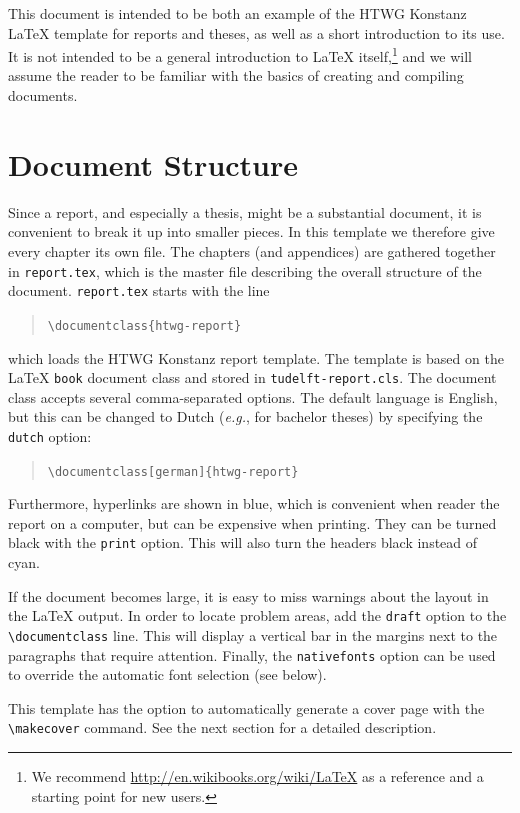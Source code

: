 This document is intended to be both an example of the HTWG Konstanz \LaTeX{} template for reports and theses, as well as a short introduction to its use. It is not intended to be a general introduction to \LaTeX{} itself,\footnote{We recommend \url{http://en.wikibooks.org/wiki/LaTeX} as a reference and a starting point for new users.} and we will assume the reader to be familiar with the basics of creating and compiling documents.


\section{Document Structure}

Since a report, and especially a thesis, might be a substantial document, it is convenient to break it up into smaller pieces. In this template we therefore give every chapter its own file. The chapters (and appendices) are gathered together in \texttt{report.tex}, which is the master file describing the overall structure of the document. \texttt{report.tex} starts with the line
\begin{quote}
	\texttt{\textbackslash documentclass\{htwg-report\}}
\end{quote}
which loads the HTWG Konstanz report template. The template is based on the \LaTeX{} \texttt{book} document class and stored in \texttt{tudelft-report.cls}. The document class accepts several comma-separated options. The default language is English, but this can be changed to Dutch (\emph{e.g.}, for bachelor theses) by specifying the \texttt{dutch} option:
\begin{quote}
	\texttt{\textbackslash documentclass[german]\{htwg-report\}}
\end{quote}
Furthermore, hyperlinks are shown in blue, which is convenient when reader the report on a computer, but can be expensive when printing. They can be turned black with the \texttt{print} option. This will also turn the headers black instead of cyan.

If the document becomes large, it is easy to miss warnings about the layout in the \LaTeX{} output. In order to locate problem areas, add the \texttt{draft} option to the \texttt{\textbackslash documentclass} line. This will display a vertical bar in the margins next to the paragraphs that require attention. Finally, the \texttt{nativefonts} option can be used to override the automatic font selection (see below).

This template has the option to automatically generate a cover page with the \texttt{\textbackslash makecover} command. See the next section for a detailed description.

